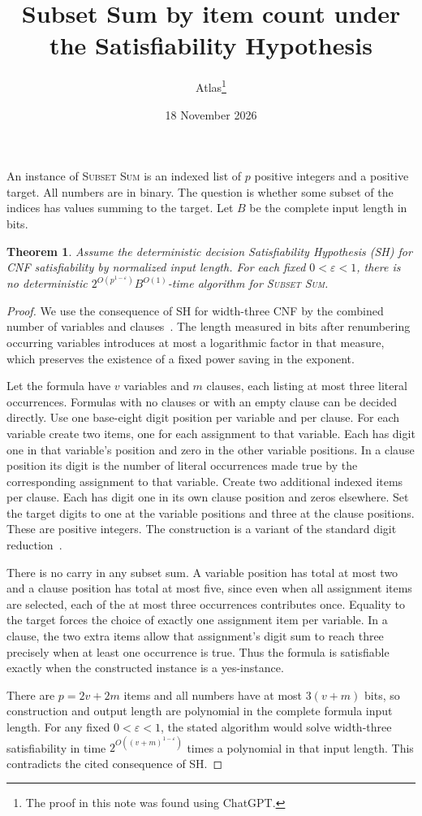 \documentclass[11pt]{article}
\title{Subset Sum by item count under the Satisfiability Hypothesis}
\author{Atlas\thanks{The proof in this note was found using ChatGPT.}}
\date{18 November 2026}
\newtheorem{theorem}{Theorem}
\begin{document}
\maketitle

An instance of \textsc{Subset Sum} is an indexed list of \(p\) positive
integers and a positive target. All numbers are in binary. The question is
whether some subset of the indices has values summing to the target.
Let \(B\) be the complete input length in bits.

\hypertarget{subset-sum-item-count-sh}{}
\begin{theorem}\label{thm:subset-sum-sh}
Assume the deterministic decision Satisfiability Hypothesis (SH) for
CNF satisfiability by normalized input length. For each fixed
\(0<\varepsilon<1\), there is no deterministic
\(2^{O(p^{1-\varepsilon})}B^{O(1)}\)-time algorithm for \textsc{Subset Sum}.
\end{theorem}

\begin{proof}
We use the consequence of SH for width-three CNF by the combined number
of variables and clauses~\cite[Lemma~2.1]{sh}. The length measured in
bits after renumbering occurring variables introduces at most a logarithmic
factor in that measure, which preserves the existence of a fixed power
saving in the exponent.

Let the formula have \(v\) variables and \(m\) clauses, each listing at most
three literal occurrences. Formulas with no clauses or with an empty clause
can be decided directly. Use one base-eight digit position per variable and
per clause. For each variable create two items, one for each assignment to
that variable. Each has digit one in that variable's position and zero in
the other variable positions. In a clause position its digit is the number
of literal occurrences made true by the corresponding assignment to that
variable. Create two additional indexed items per clause. Each has digit
one in its own clause position and zeros elsewhere. Set the target digits
to one at the variable positions and three at the clause positions.
These are positive integers. The construction is a variant of the
standard digit reduction~\cite[Section~3]{weighted}.

There is no carry in any subset sum. A variable position has total at
most two and a clause position has total at most five, since even when
all assignment items are selected, each of the at most three occurrences
contributes once. Equality to the target forces the choice of exactly one
assignment item per variable. In a clause, the two extra items allow that
assignment's digit sum to reach three precisely when at least one
occurrence is true. Thus the formula is satisfiable exactly when the
constructed instance is a yes-instance.

There are \(p=2v+2m\) items and all numbers have at most \(3(v+m)\)
bits, so construction and output length are polynomial in the complete
formula input length. For any fixed \(0<\varepsilon<1\), the stated
algorithm would solve width-three satisfiability in time
\(2^{O((v+m)^{1-\varepsilon})}\) times a polynomial in that input length.
This contradicts the cited consequence of SH.
\end{proof}
\end{document}
